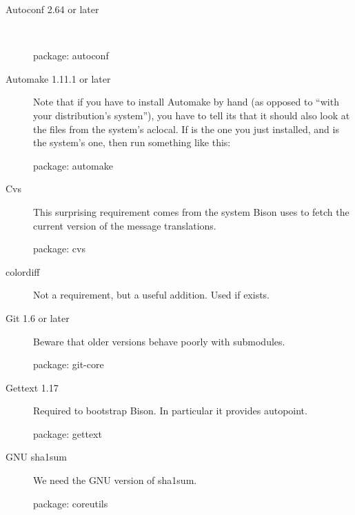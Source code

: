 \begin{description}
\item[Autoconf 2.64 or later]~\\

\begin{package}
package: autoconf
\end{package}

\item[Automake 1.11.1 or later] Note that if you have to install Automake by
  hand (as opposed to ``with your distribution's system''), you have to tell
  its  that it should also look at the files from the
  system's aclocal.  If  is the one you just
  installed, and  is the system's one, then run
  something like this:


\begin{package}
package: automake
\end{package}

\item[Cvs]
  This surprising requirement comes from the system Bison uses to fetch
  the current version of the message translations.
\begin{package}
package: cvs
\end{package}

\item[colordiff] Not a requirement, but a useful addition.  Used if exists.

\item[Git 1.6 or later]
  Beware that older versions behave poorly with submodules.
\begin{package}
package: git-core
\end{package}

\item[Gettext 1.17]
  Required to bootstrap Bison.  In particular it provides autopoint.
\begin{package}
package: gettext
\end{package}

\item[GNU sha1sum]
  We need the GNU version of sha1sum.
\begin{package}
package: coreutils
\end{package}


\end{description}
